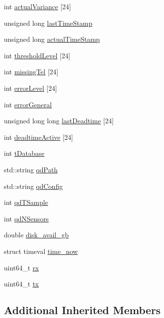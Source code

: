 \begin{DoxyCompactItemize}
$$int \hyperlink{classReader_a20de0ffe57bd63c8b322a552d0eea7aa}{actual\-Variance} \mbox{[}24\mbox{]}
\item 
unsigned long \hyperlink{classReader_a17df32c8ae16df4d276d73b8d955c0e6}{last\-Time\-Stamp}
\item 
unsigned long \hyperlink{classReader_a0f8a298ecdd8c02e9e1a428c1634581c}{actual\-Time\-Stamp}
\item 
int \hyperlink{classReader_ae79b47c731fc265b3ca401cdbdccd726}{threshold\-Level} \mbox{[}24\mbox{]}
\item 
int \hyperlink{classReader_a9574d13bbda6fd1a17f1aca61e2a0df1}{missing\-Tel} \mbox{[}24\mbox{]}
\item 
int \hyperlink{classReader_a92b7378790ac975b65f159b6502cb47e}{error\-Level} \mbox{[}24\mbox{]}
\item 
int \hyperlink{classReader_ae6d9d7dae0b2b71985a8d2df2ee09819}{error\-General}
\item 
unsigned long long \hyperlink{classReader_ad7344b65bf38e5ea1a22230ad37fc95a}{last\-Deadtime} \mbox{[}24\mbox{]}
\item 
int \hyperlink{classReader_aee93b4550b1f413ac5e263e0a2f85b25}{deadtime\-Active} \mbox{[}24\mbox{]}
\item 
int \hyperlink{classReader_aeb5766561480656c2a2182b86e2cdae8}{t\-Database}
\item 
std\-::string \hyperlink{classReader_ad92d8d94dae6b66a5278cb792ca0a206}{qd\-Path}
\item 
std\-::string \hyperlink{classReader_ab0da569b087b0ba5efdb22ee8459e40d}{qd\-Config}
\item 
int \hyperlink{classReader_a69f380acc4c2b439f1cd940b12349d92}{qd\-T\-Sample}
\item 
int \hyperlink{classReader_a1807cf089712f144cbf20b280dc36240}{qd\-N\-Sensors}
\item 
double \hyperlink{classReader_a0746e7e813a05ee8648875ee2776b5f4}{disk\-\_\-avail\-\_\-gb}
\item 
struct timeval \hyperlink{classReader_a4b26c73a9ce2d08fd78b11dca25c0ad6}{time\-\_\-now}
\item 
uint64\-\_\-t \hyperlink{classReader_a759fcd53649d1d49e66ff8e9cfd4b452}{rx}
\item 
uint64\-\_\-t \hyperlink{classReader_acb6c6053d7bd278014e04c34fdad4e0e}{tx}
\end{DoxyCompactItemize}
\subsection*{Additional Inherited Members}


